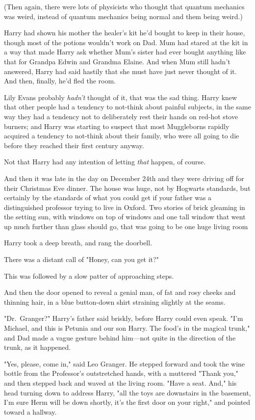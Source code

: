 (Then again, there were lots of physicists who thought that quantum mechanics
was weird, instead of quantum mechanics being normal and them being weird.)

Harry had shown his mother the healer's kit he'd bought to keep in their house,
though most of the potions wouldn't work on Dad. Mum had stared at the kit in a
way that made Harry ask whether Mum's sister had ever bought anything like that
for Grandpa Edwin and Grandma Elaine. And when Mum still hadn't answered, Harry
had said hastily that she must have just never thought of it. And then,
finally, he'd fled the room.

Lily Evans probably \emph{hadn't} thought of it, that was the sad thing. Harry
knew that other people had a tendency to not-think about painful subjects, in
the same way they had a tendency not to deliberately rest their hands on
red-hot stove burners; and Harry was starting to suspect that most Muggleborns
rapidly acquired a tendency to not-think about their family, who were all going
to die before they reached their first century anyway.

Not that Harry had any intention of letting \emph{that} happen, of course.

And then it was late in the day on December 24th and they were driving off for
their Christmas Eve dinner.
\sbreak
The house was huge, not by Hogwarts standards, but certainly by the standards
of what you could get if your father was a distinguished professor trying to
live in Oxford. Two stories of brick gleaming in the setting sun, with windows
on top of windows and one tall window that went up much further than glass
should go, that was going to be one huge living room{\el}

Harry took a deep breath, and rang the doorbell.

There was a distant call of "Honey, can you get it?"

This was followed by a slow patter of approaching steps.

And then the door opened to reveal a genial man, of fat and rosy cheeks and
thinning hair, in a blue button-down shirt straining slightly at the seams.

"Dr.~Granger?" Harry's father said briskly, before Harry could even speak. "I'm
Michael, and this is Petunia and our son Harry. The food's in the magical
trunk," and Dad made a vague gesture behind him—not quite in the direction of
the trunk, as it happened.

"Yes, please, come in," said Leo Granger. He stepped forward and took the wine
bottle from the Professor's outstretched hands, with a muttered "Thank you,"
and then stepped back and waved at the living room. "Have a seat. And," his
head turning down to address Harry, "all the toys are downstairs in the
basement, I'm sure Herm will be down shortly, it's the first door on your
right," and pointed toward a hallway.

